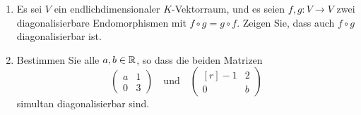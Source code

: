 \documentclass[a4paper, 10pt]{scrartcl}
\begin{document}
\begin{question}[subtitle = Simultane Diagonalisierbarkeit]
  \begin{enumerate}
    \item
      Es sei $V$ ein endlichdimensionaler $K$-Vektorraum, und es seien $f, g \colon V \to V$ zwei diagonalisierbare Endomorphismen mit $f \circ g = g \circ f$.
      Zeigen Sie, dass auch $f \circ g$ diagonalisierbar ist.
    \item
      Bestimmen Sie alle $a, b \in \mathbb{R}$, so dass die beiden Matrizen
      \[
        \begin{pmatrix}
          a & 1 \\
          0 & 3
        \end{pmatrix}
        \quad\text{und}\quad
        \begin{pmatrix*}[r]
          -1  & 2 \\
          0  & b
        \end{pmatrix*}
      \]
      simultan diagonalisierbar sind.
      
  \end{enumerate}
\end{question}
\end{document}
